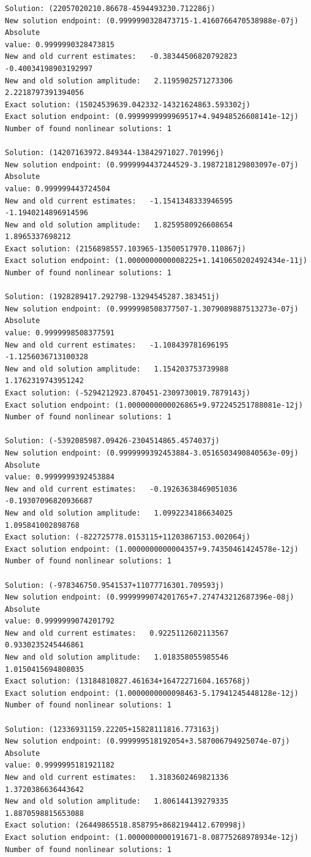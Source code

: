 \documentclass[11pt]{article}
\begin{document}
\begin{Verbatim}[commandchars=\\\{\}]
Solution: (22057020210.86678-4594493230.712286j)
New solution endpoint: (0.9999990328473715-1.4160766470538988e-07j) Absolute
value: 0.9999990328473815
New and old current estimates:   -0.38344506820792823    -0.40034198903192997
New and old solution amplitude:   2.1195902571273306    2.2218797391394056
Exact solution: (15024539639.042332-14321624863.593302j)
Exact solution endpoint: (0.9999999999969517+4.94948526608141e-12j)
Number of found nonlinear solutions: 1

Solution: (14207163972.849344-13842971027.701996j)
New solution endpoint: (0.9999994437244529-3.1987218129803097e-07j) Absolute
value: 0.999999443724504
New and old current estimates:   -1.1541348333946595    -1.1940214896914596
New and old solution amplitude:   1.8259580926608654    1.8965337698212
Exact solution: (2156898557.103965-13500517970.110867j)
Exact solution endpoint: (1.0000000000008225+1.1410650202492434e-11j)
Number of found nonlinear solutions: 1

Solution: (1928289417.292798-13294545287.383451j)
New solution endpoint: (0.9999998508377507-1.3079089887513273e-07j) Absolute
value: 0.9999998508377591
New and old current estimates:   -1.108439781696195    -1.1256036713100328
New and old solution amplitude:   1.154203753739988    1.1762319743951242
Exact solution: (-5294212923.870451-2309730019.7879143j)
Exact solution endpoint: (1.0000000000026865+9.972245251788081e-12j)
Number of found nonlinear solutions: 1

Solution: (-5392085987.09426-2304514865.4574037j)
New solution endpoint: (0.9999999392453884-3.0516503490840563e-09j) Absolute
value: 0.9999999392453884
New and old current estimates:   -0.19263638469051036    -0.19307096820936687
New and old solution amplitude:   1.0992234186634025    1.095841002898768
Exact solution: (-822725778.0153115+11203867153.002064j)
Exact solution endpoint: (1.0000000000004357+9.74350461424578e-12j)
Number of found nonlinear solutions: 1

Solution: (-978346750.9541537+11077716301.709593j)
New solution endpoint: (0.9999999074201765+7.274743212687396e-08j) Absolute
value: 0.9999999074201792
New and old current estimates:   0.9225112602113567    0.9330235245446861
New and old solution amplitude:   1.018358055985546    1.0150415694808035
Exact solution: (13184810827.461634+16472271604.165768j)
Exact solution endpoint: (1.0000000000098463-5.17941245448128e-12j)
Number of found nonlinear solutions: 1

Solution: (12336931159.22205+15828111816.773163j)
New solution endpoint: (0.999999518192054+3.587006794925074e-07j) Absolute
value: 0.9999995181921182
New and old current estimates:   1.3183602469821336    1.3720386636443642
New and old solution amplitude:   1.806144139279335    1.8870598815653088
Exact solution: (26449865518.858795+8682194412.670998j)
Exact solution endpoint: (1.0000000000191671-8.08775268978934e-12j)
Number of found nonlinear solutions: 1


\end{Verbatim}
\end{document}
